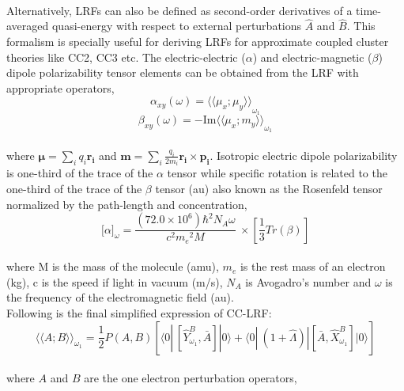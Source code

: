\\
Alternatively, LRFs can also be defined as second-order derivatives 
of a time-averaged quasi-energy with respect to external perturbations $\hat{A}$ and
$\hat{B}$. This formalism is specially useful for deriving LRFs for approximate
coupled cluster theories like CC2, CC3 etc. 
The electric-electric ($\alpha$) and electric-magnetic ($\beta$)
dipole polarizability tensor elements can be obtained from the LRF with appropriate
operators,
\\
\begin{equation}
\alpha_{xy}(\omega) = {\langle\langle \mu_x;\mu_y\rangle\rangle}_{\omega_1}
\end{equation}
\begin{equation}
\beta_{xy}(\omega) = {-\text{Im} \langle\langle \mu_x;m_y\rangle\rangle}_{\omega_1}
\end{equation}
\\
where $\bm{\mu} = \sum_i q_i \bm{r_i} $ and $\bm{m} = \sum_i \frac{q_i}{2m_i} \bm{r_i} \times \bm{p_i}$. 
Isotropic electric dipole polarizability is one-third of the trace of the $\alpha$ tensor 
while specific rotation is related to the one-third of the trace 
of the $\beta$ tensor (au) also known as the Rosenfeld tensor normalized
by the path-length and concentration\cite{},
\\
\begin{equation}
{\lbrack\alpha\rbrack}_{\omega} = \frac{(72.0 \times 10^6){\hbar}^2 N_A\omega}{c^2{m_e}^2 M}
\ \times \left[ \frac{1}{3}Tr(\beta)\right]
\end{equation}
\\
where M is the mass of the molecule (amu), $m_e$ is the rest mass of an electron
(kg), c is the speed if light in vacuum (m/s), $N_A$ is Avogadro's number and $\omega$
is the frequency of the electromagnetic field (au). \\
Following is the final simplified expression of CC-LRF\cite{}: 
\\
\begin{equation}
{\langle\langle A;B\rangle\rangle}_{\omega_1} =  \frac{1}{2}\hat{P}(A,B)[\langle 0 | \
[\hat{Y}^{B}_{\omega_1}, \bar{A}]|0\rangle + \langle 0 | \
(1 + \hat{\Lambda})|[\bar{A},\hat{X}^{B}_{\omega_1}]|0\rangle]
\end{equation}
\\
where $A$ and $B$ are the one electron perturbation operators,
